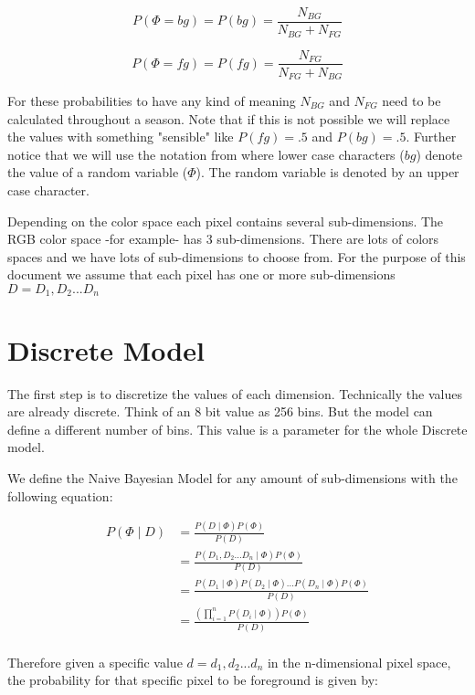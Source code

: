 \documentclass[a4paper,12pt]{report}
\begin{document}
\begin{equation}
P(\Phi= bg) = P(bg) = \frac{N_{BG}}{N_{BG}+N_{FG}}
\end{equation}

\begin{equation}
P(\Phi= fg) = P(fg) = \frac{N_{FG}}{N_{FG}+N_{BG}}
\end{equation}

For these probabilities to have any kind of meaning $N_{BG}$ and $N_{FG}$ need
to be calculated throughout a season. Note that if this is not possible we will
replace the values with something "sensible" like $P(fg)=.5$ and $P(bg)=.5$.
Further notice that we will use the notation from %
where
lower case characters ($bg$) denote the value of a random variable ($\Phi$).
The random variable is denoted by an upper case character.

Depending on the color space each pixel contains several sub-dimensions. The RGB
color space -for example- has 3 sub-dimensions. There are lots of colors spaces and we have
lots of sub-dimensions to choose from. For the purpose of this document we assume
that each pixel has one or more sub-dimensions $D={D_1, D_2... D_n}$

\section{Discrete Model}
The first step is to discretize the values of each dimension. Technically the
values are already discrete. Think of an 8 bit value as 256 bins. But the model
can define a different number of bins. This value is a parameter for the
whole Discrete model.

We define the Naive Bayesian Model for any amount of sub-dimensions with the
following equation:

\begin{align}
P(\Phi \mid D)
    &= \frac{P(D \mid \Phi) P(\Phi)}
            {P(D)} \\
    &= \frac{P(D_1, D_2...D_n \mid \Phi) P(\Phi)}
            {P(D)} \\
    &= \frac{P(D_1 \mid \Phi)
             P(D_2 \mid \Phi) ...
             P(D_n \mid \Phi) P(\Phi)}
            {P(D)} \\
    &= \frac{(\prod_{i=1}^n{P(D_i \mid \Phi)}) P(\Phi)}
            {P(D)} \\
\end{align}

Therefore given a specific value $d={d_1,d_2...d_n}$ in the n-dimensional
pixel space, the probability for that specific pixel to be foreground is
given by:
\end{document}
